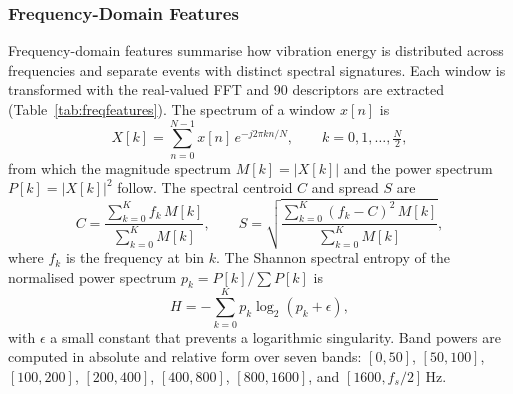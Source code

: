 \subsubsection{Frequency-Domain Features}
\label{sec:chap3FreqFeatures}
Frequency-domain features summarise how vibration energy is distributed across frequencies and separate events with distinct spectral signatures. Each window is transformed with the real-valued FFT and 90 descriptors are extracted (Table~\ref{tab:freqfeatures}). The spectrum of a window $x[n]$ is
\begin{equation}
	X[k] = \sum_{n=0}^{N-1} x[n]\, e^{-j 2\pi k n / N}, \qquad k = 0, 1, \ldots, \tfrac{N}{2},
	\label{eq:fft}
\end{equation}
from which the magnitude spectrum $M[k] = |X[k]|$ and the power spectrum $P[k] = |X[k]|^2$ follow. The spectral centroid $C$ and spread $S$ are
\begin{equation}
	C = \frac{\sum_{k=0}^{K} f_k \, M[k]}{\sum_{k=0}^{K} M[k]}, \qquad
	S = \sqrt{\frac{\sum_{k=0}^{K} (f_k - C)^2 \, M[k]}{\sum_{k=0}^{K} M[k]}},
	\label{eq:centroid}
\end{equation}
where $f_k$ is the frequency at bin $k$. The Shannon spectral entropy of the normalised power spectrum $p_k = P[k] / \sum P[k]$ is
\begin{equation}
	H = -\sum_{k=0}^{K} p_k \log_2 (p_k + \epsilon),
	\label{eq:entropy}
\end{equation}
with $\epsilon$ a small constant that prevents a logarithmic singularity. Band powers are computed in absolute and relative form over seven bands: $[0,50]$, $[50,100]$, $[100,200]$, $[200,400]$, $[400,800]$, $[800,1600]$, and $[1600, f_s/2]$\,Hz.

